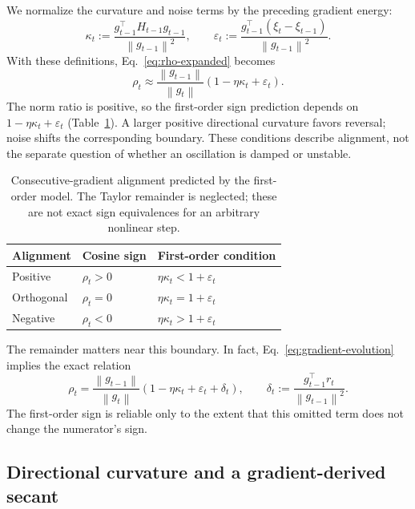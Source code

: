 \documentclass[11pt]{article}
\newcommand{\norm}[1]{\left\lVert#1\right\rVert}
\begin{document}
We normalize the curvature and noise terms by the preceding gradient energy:
\begin{equation}
  \kappa_t:=\frac{g_{t-1}^\top H_{t-1}g_{t-1}}{\norm{g_{t-1}}^2},
  \qquad
  \varepsilon_t:=\frac{g_{t-1}^\top(\xi_t-\xi_{t-1})}
                            {\norm{g_{t-1}}^2}.
  \label{eq:kappa-epsilon}
\end{equation}
With these definitions, Eq.~\eqref{eq:rho-expanded} becomes
\begin{equation}
  \boxed{\rho_t\approx\frac{\norm{g_{t-1}}}{\norm{g_t}}
                   (1-\eta\kappa_t+\varepsilon_t).}
  \label{eq:rho-normalized}
\end{equation}
The norm ratio is positive, so the first-order sign prediction depends on
$1-\eta\kappa_t+\varepsilon_t$ (Table~\ref{tab:sign}). A larger positive
directional curvature favors reversal; noise shifts the corresponding boundary.
These conditions describe alignment, not the separate question of whether an
oscillation is damped or unstable.

\begin{table}[htbp]
\centering
\caption{Consecutive-gradient alignment predicted by the first-order model.
The Taylor remainder is neglected; these are not exact sign equivalences for
an arbitrary nonlinear step.}
\label{tab:sign}
\begin{tabular}{lll}
\toprule
Alignment & Cosine sign & First-order condition\\
\midrule
Positive & $\rho_t>0$ & $\eta\kappa_t<1+\varepsilon_t$\\
Orthogonal & $\rho_t=0$ & $\eta\kappa_t=1+\varepsilon_t$\\
Negative & $\rho_t<0$ & $\eta\kappa_t>1+\varepsilon_t$\\
\bottomrule
\end{tabular}
\end{table}

The remainder matters near this boundary. In fact,
Eq.~\eqref{eq:gradient-evolution} implies the exact relation
\begin{equation}
  \rho_t=\frac{\norm{g_{t-1}}}{\norm{g_t}}
          (1-\eta\kappa_t+\varepsilon_t+\delta_t),
  \qquad
  \delta_t:=\frac{g_{t-1}^\top r_t}{\norm{g_{t-1}}^2}.
  \label{eq:remainder}
\end{equation}
The first-order sign is reliable only to the extent that this omitted term does
not change the numerator's sign.

\subsection{Directional curvature and a gradient-derived secant}
\end{document}
